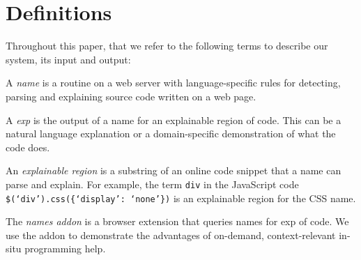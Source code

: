 \section{Definitions}

Throughout this paper, that we refer to the following terms to describe our system, its input and output:

A \emph{\gls{name}} is a routine on a web server with language-specific rules for detecting, parsing and explaining source code written on a web page.

A \emph{\gls{exp}} is the output of a \gls{name} for an explainable region of code. This can be a natural language explanation or a domain-specific demonstration of what the code does.


An \emph{explainable region} is a substring of an online code snippet that a \gls{name} can parse and explain.  For example, the term \texttt{div} in the JavaScript code \texttt{\$(`div').css(\{`display': `none'\})} is an explainable region for the CSS \gls{name}.

The \emph{\Glspl{name} addon} is a browser extension that queries \glspl{name} for \gls{exp} of code.  We use the addon to demonstrate the advantages of on-demand, context-relevant in-situ programming help.